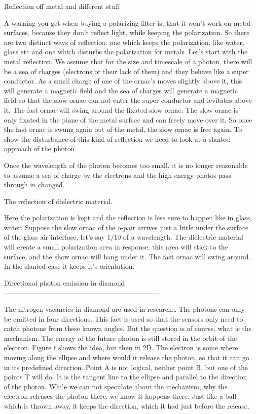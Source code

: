 Reflection off metal and different stuff

A warning you get when buying a polarizing filter is, that it won't work on metal surfaces, because they don't reflect light, while keeping the polarization. So there are two distinct ways of reflection: one which keeps the polarization, like water, glass etc and one which disturbs the polarization for metals.
Let's start with the metal reflection. We assume that for the size and timescale of a photon, there will be a sea of charges (electrons or their lack of them) and they behave like a super conductor. As a small charge of one of the ornac’s moves slightly above it, this will generate a magnetic field and the sea of charges will generate a magnetic field so that the slow ornac can not enter the super conductor and levitates above it. The fast ornac will swing around the fixated slow ornac. The slow ornac is only fixated in the plane of the metal surface and can freely move over it. So once the fast ornac is swung again out of the metal, the slow ornac is free again.
To show the disturbance of this kind of reflection we need to look at a slanted approach of the photon.

Once the wavelength of the photon becomes too small, it is no longer reasonable to assume a sea of charge by the electrons and the high energy photos pass through in changed.

The reflection of dielectric material.

Here the polarization is kept and the reflection is less sure to happen like in glass, water. Suppose the slow ornac of the o-pair arrives just a little under the surface of the glass air interface, let's say 1/10 of a wavelength. The dielectric material will create a small polarization area in response, this area will stick to the surface, and the show ornac will hang under it. The fast ornac will swing around. In the slanted case it keeps it's orientation.




Directional photon emission in diamond
--------------------------------------------------------------------

The nitrogen vacancies in diamond are used in research…
The photons can only be emitted in four directions. This fact is used so that the sensors only need to catch photons from these known angles. But the question is of course, what is the mechanism. The energy of the future photon is still stored in the orbit of the electron. Figure f shows the idea, but then in 2D. The electron is some where moving along the ellipse and where would it release the photon, so that it can go in its predefined direction. Point A is not logical, neither point B, but one of the points T will do. It is the tangent line to the ellipse and parallel to the direction of the photon. While we can not speculate about the mechanism, why the electron releases the photon there, we know it happens there. Just like a ball which is thrown away, it keeps the direction, which it had just before the release. 

